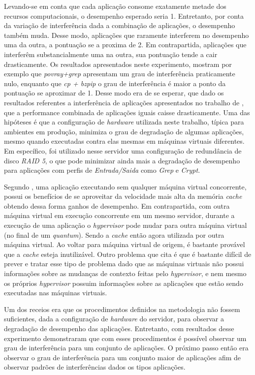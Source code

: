 Levando-se em conta que cada aplicação consome exatamente metade dos recursos computacionais, o desempenho esperado seria 1. Entretanto, por conta da variação de interferência dada a combinação de aplicações, o desempenho também muda. Desse modo, aplicações que raramente interferem no desempenho uma da outra, a pontuação se a proxima de 2. Em contrapartida, aplicações que interferêm substancialmente uma na outra, sua pontuação tende a cair drasticamente. Os resultados apresentados neste experimento, mostram por exemplo que \textit{povray+grep} apresentam um grau de interferência praticamente nulo, enquanto que \textit{cp + bzpip} o grau de interferência é maior a ponto da pontuação se aproximar de 1. Desse modo era de se esperar, que dado os resultados referentes a interferência de aplicações apresentados no trabalho de , que a performance combinada de aplicações iguais caisse drasticamente. Uma das hipóteses é que a configuração de \textit{hardware} utilizada neste trabalho, típica para ambientes em produção, minimiza o grau de degradação de algumas aplicações, mesmo quando executadas contra elas mesmas em máquinas virtuais diferentes. Em específico, foi utilizado nesse servidor uma configuração de redundância de disco \textit{RAID 5}, o que pode minimizar ainda mais a degradação de desempenho para aplicações com perfis de \textit{Entrada/Saida} como \textit{Grep} e \textit{Crypt}.

Segundo , uma aplicação executando sem qualquer máquina virtual concorrente, possui os benefícios de se aproveitar da velocidade mais alta da memória \textit{cache} obtendo dessa forma ganhos de desempenho. Em contrapartida, com outra máquina virtual em execução concorrente em um mesmo servidor, durante a execução de uma aplicação o \textit{hypervisor} pode mudar para outra máquina virtual (no final de um \textit{quantum}). Sendo a \textit{cache} então agora utilizada por outra máquina virtual. Ao voltar para máquina virtual de origem, é bastante provável que a  \textit{cache} esteja inutilizável. Outro problema que  cita é que é bastante difícil de prever e tratar esse tipo de problema dado que as máquinas virtuais não possui informações sobre as mudanças de contexto feitas pelo \textit{hypervisor}, e nem mesmo os próprios \textit{hypervisor} possuim informações sobre as aplicações que estão sendo executadas nas máquinas virtuais.

Um dos receios era que os procedimentos definidos na metodologia não fossem suficientes, dada a configuração de \textit{hardware} do servidor, para observar a degradação de desempenho das aplicações. Entretanto, com resultados desse experimento demonstraram que com esses procedimentos é possível observar um grau de interferência para um conjunto de aplicações. O próximo passo então era observar o grau de interferência para um conjunto maior de aplicações afim de observar padrões de interferências dados os tipos aplicações.

